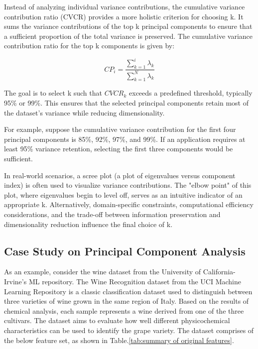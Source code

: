 Instead of analyzing individual variance contributions, the cumulative variance contribution ratio (CVCR) provides a more holistic criterion for choosing k. It sums the variance contributions of the top k principal components to ensure that a sufficient proportion of the total variance is preserved. The cumulative variance contribution ratio for the top k components is given by:

\begin{equation}
	\label{eq:equation_3}
	CP_i = \frac{\sum_{k = 1}^i \lambda_k}{\sum_{k = 1}^N \lambda_k}
\end{equation}

The goal is to select k such that $CVCR_{k}$ exceeds a predefined threshold, typically 95\% or 99\%. This ensures that the selected principal components retain most of the dataset's variance while reducing dimensionality.

For example, suppose the cumulative variance contribution for the first four principal components is 85\%, 92\%, 97\%, and 99\%. If an application requires at least 95\% variance retention, selecting the first three components would be sufficient.

In real-world scenarios, a scree plot (a plot of eigenvalues versus component index) is often used to visualize variance contributions. The "elbow point" of this plot, where eigenvalues begin to level off, serves as an intuitive indicator of an appropriate k. Alternatively, domain-specific constraints, computational efficiency considerations, and the trade-off between information preservation and dimensionality reduction influence the final choice of k.

\subsection{Case Study on Principal Component Analysis}
As an example, consider the wine dataset from the University of California-Irvine’s ML repository\cite{pca-5}. The Wine Recognition dataset from the UCI Machine Learning Repository is a classic classification dataset used to distinguish between three varieties of wine grown in the same region of Italy. Based on the results of chemical analysis, each sample represents a wine derived from one of the three cultivars. The dataset aims to evaluate how well different physicochemical characteristics can be used to identify the grape variety. The dataset comprises of the below feature set, as shown in Table.\ref{tab:summary of original features}.

